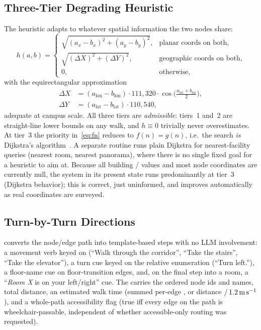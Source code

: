 \subsection{Three-Tier Degrading Heuristic}
The heuristic adapts to whatever spatial information the two nodes share:
\begin{equation}
h(a,b) =
\begin{cases}
\sqrt{(a_x - b_x)^2 + (a_y - b_y)^2}, & \text{planar coords on both,}\\[1.2ex]
\sqrt{(\Delta\!X)^2 + (\Delta\!Y)^2}, & \text{geographic coords on both,}\\[1.2ex]
0, & \text{otherwise,}
\end{cases}
\label{eq:heur}
\end{equation}
with the equirectangular approximation
\begin{align}
\Delta\!X &= (a_{\text{lon}} - b_{\text{lon}})\cdot 111{,}320 \cdot \cos\!\Big(\tfrac{a_{\text{lat}} + b_{\text{lat}}}{2}\Big),\\
\Delta\!Y &= (a_{\text{lat}} - b_{\text{lat}})\cdot 110{,}540,
\end{align}
adequate at campus scale. All three tiers are \emph{admissible}: tiers~1
and~2 are straight-line lower bounds on any walk, and $h \equiv 0$ trivially
never overestimates. At tier~3 the priority in~\eqref{eq:fn} reduces to
$f(n) = g(n)$, i.e.\ the search \emph{is} Dijkstra's
algorithm~\cite{dijkstra1959note}. A separate 
routine runs plain Dijkstra for nearest-facility queries (nearest room,
nearest panorama), where there is no single fixed goal for a heuristic to
aim at. Because all building / values and
most node coordinates are currently null, the system in its present state
runs predominantly at tier~3 (Dijkstra behavior); this is correct, just
uninformed, and improves automatically as real coordinates are surveyed.

\subsection{Turn-by-Turn Directions}
 converts the node/edge path into template-based
steps with no LLM involvement: a movement verb keyed on 
(``Walk through the corridor'', ``Take the stairs'', ``Take the
elevator''), a turn cue keyed on the relative  enumeration
(``Turn left.''), a floor-name cue on floor-transition edges, and, on the
final step into a room, a ``\emph{Room X} is on your left/right'' cue. The
 carries the ordered node ids and names, total
distance, an estimated walk time (summed per-edge , or
distance $/\,1.2\,\text{m\,s}^{-1}$), and a whole-path accessibility flag
(true iff every edge on the path is wheelchair-passable, independent of
whether accessible-only routing was requested).
